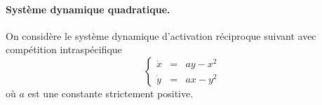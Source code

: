 \paragraph{Système dynamique quadratique.} \label{SystDyn-Quadratique}
On considère le système dynamique d’activation réciproque suivant avec compétition intraspécifique
$$
\left\{\begin{array}{rcl}
        \dot x & = & a y - x^2 \\ 
        \dot y & = & a x - y^2 
        \end{array}\right.
$$
où $a$ est une constante strictement positive.
